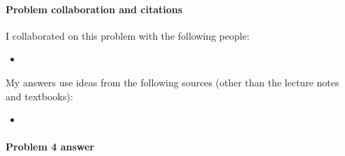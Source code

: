 

\vfill

\paragraph{Problem  collaboration and citations}

I collaborated on this problem with the following people:
\begin{blue}
  \begin{itemize}
  \item \REPLACEME                    %
  \end{itemize}
\end{blue}

My answers use ideas from the following sources (other than the lecture notes and textbooks): 
\begin{blue}
  \begin{itemize}
  \item \REPLACEME                    %
  \end{itemize}
\end{blue}

\newpage                      %


\paragraph{Problem 4 answer}


